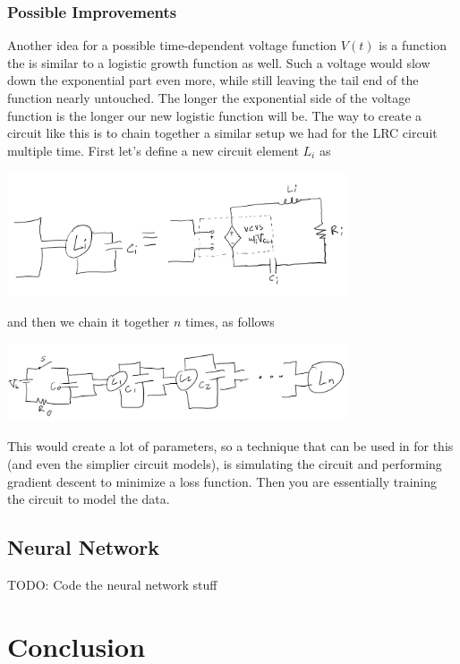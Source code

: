 \documentclass{report}
\begin{document}
            \subsubsection{Possible Improvements}
                Another idea for a possible time-dependent voltage function $V(t)$ is a function the is similar to a logistic growth function as well. Such a voltage would slow down the exponential part even more, while still leaving the tail end of the function nearly untouched. The longer the exponential side of the voltage function is the longer our new logistic function will be.
                \newline\indent
                The way to create a circuit like this is to chain together a similar setup we had for the LRC circuit multiple time. First let's define a new circuit element $L_i$ as
                \begin{center}
                    \includegraphics[width=10cm]{drawings/Li.png}
                \end{center}
                and then we chain it together $n$ times, as follows
                \begin{center}
                    \includegraphics[width=10cm]{drawings/chain.png}
                \end{center}
                This would create a lot of parameters, so a technique that can be used in for this (and even the simplier circuit models), is simulating the circuit and performing gradient descent to minimize a loss function. Then you are essentially training the circuit to model the data.
        \subsection{Neural Network}
            TODO: Code the neural network stuff
    \section{Conclusion}
\end{document}
